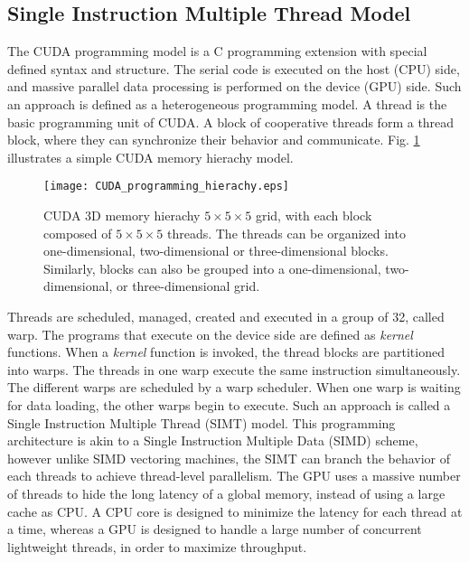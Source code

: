 \documentclass[letterpaper, 10pt, conference]{ieeeconf}
\begin{document}
\subsection{Single Instruction Multiple Thread Model}
The CUDA programming model is a C programming extension with special defined syntax and structure. The serial code is executed on the host (CPU) side, and massive parallel data processing is performed on the device (GPU) side. Such an approach is defined as a heterogeneous programming model. A thread is the basic programming unit of CUDA. A block of cooperative threads form a thread block, where they can synchronize their behavior and communicate. Fig. \ref{figure1} illustrates a simple CUDA memory hierachy model.
\begin{figure}[htb]
\centering
\texttt{[image: CUDA\_programming\_hierachy.eps]}
\caption{ CUDA 3D memory hierachy $5\times 5\times 5$ grid, with each block composed of $5\times 5\times 5$ threads.
The threads can be organized into one-dimensional, two-dimensional or three-dimensional blocks. Similarly, blocks can also be grouped into a one-dimensional, two-dimensional, or three-dimensional grid.
}
\label{figure1}
\end{figure} 

Threads are scheduled, managed, created and executed in a group of 32, called warp. The programs that execute on the device side are defined as \textit{kernel} functions. When a \textit{kernel} function is invoked, the thread blocks are partitioned into warps. The threads in one warp execute the same instruction simultaneously. The different warps are scheduled by a warp scheduler. When one warp is waiting for data loading, the other warps begin to execute. Such an approach is called a Single Instruction Multiple Thread (SIMT) model. This programming architecture is akin to a Single Instruction Multiple Data (SIMD) scheme, however unlike SIMD vectoring machines, the SIMT can branch the behavior of each threads to achieve thread-level parallelism. The GPU uses a massive number of threads to hide the long latency of a global memory, instead of using a large cache as CPU. A CPU core is designed to minimize the latency for each thread at a time, whereas a GPU is designed to handle a large number of concurrent lightweight threads, in order to maximize throughput.
\end{document}

